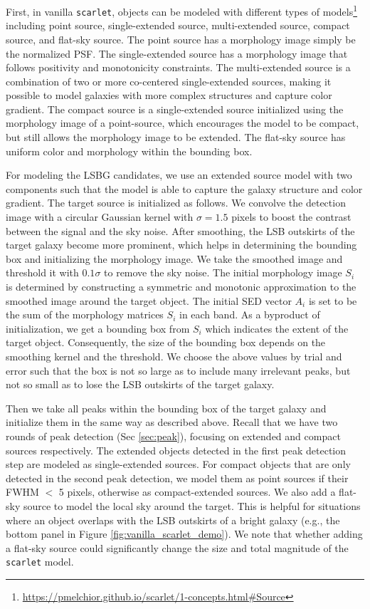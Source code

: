 \documentclass[twocolumn,astrosymb,twocolappendix]{aastex631}
\newcommand{\code}[1]{\texttt{#1}}
\begin{document}
\begin{CJK*}{UTF8}{gbsn}
First, in vanilla \code{scarlet}, objects can be modeled with different types of models\footnote{\url{https://pmelchior.github.io/scarlet/1-concepts.html\#Source}} including point source, single-extended source, multi-extended source, compact source, and flat-sky source. The point source has a morphology image simply be the normalized PSF. The single-extended source has a morphology image that follows positivity and monotonicity constraints. The multi-extended source is a combination of two or more co-centered single-extended sources, making it possible to model galaxies with more complex structures and capture color gradient. The compact source is a single-extended source initialized using the morphology image of a point-source, which encourages the model to be compact, but still allows the morphology image to be extended. The flat-sky source has uniform color and morphology within the bounding box.

For modeling the LSBG candidates, we use an extended source model with two components such that the model is able to capture the galaxy structure and color gradient. The target source is initialized as follows. We convolve the detection image with a circular Gaussian kernel with $\sigma=1.5$ pixels to boost the contrast between the signal and the sky noise. After smoothing, the LSB outskirts of the target galaxy become more prominent, which helps in determining the bounding box and initializing the morphology image. We take the smoothed image and threshold it with $0.1\sigma$ to remove the sky noise. The initial morphology image $S_i$ is determined by constructing a symmetric and monotonic approximation to the smoothed image around the target object. The initial SED vector $A_i$ is set to be the sum of the morphology matrices $S_i$ in each band. As a byproduct of initialization, we get a bounding box from $S_i$ which indicates the extent of the target object. Consequently, the size of the bounding box depends on the smoothing kernel and the threshold. We choose the above values by trial and error such that the box is not so large as to include many irrelevant peaks, but not so small as to lose the LSB outskirts of the target galaxy. 

Then we take all peaks within the bounding box of the target galaxy and initialize them in the same way as described above. Recall that we have two rounds of peak detection (Sec \ref{sec:peak}), focusing on extended and compact sources respectively. The extended objects detected in the first peak detection step are modeled as single-extended sources. For compact objects that are only detected in the second peak detection, we model them as point sources if their FWHM $<$ 5 pixels, otherwise as compact-extended sources. We also add a flat-sky source to model the local sky around the target. This is helpful for situations where an object overlaps with the LSB outskirts of a bright galaxy (e.g., the bottom panel in Figure \ref{fig:vanilla_scarlet_demo}). We note that whether adding a flat-sky source could significantly change the size and total magnitude of the \code{scarlet} model.


\end{CJK*}
\end{document}
